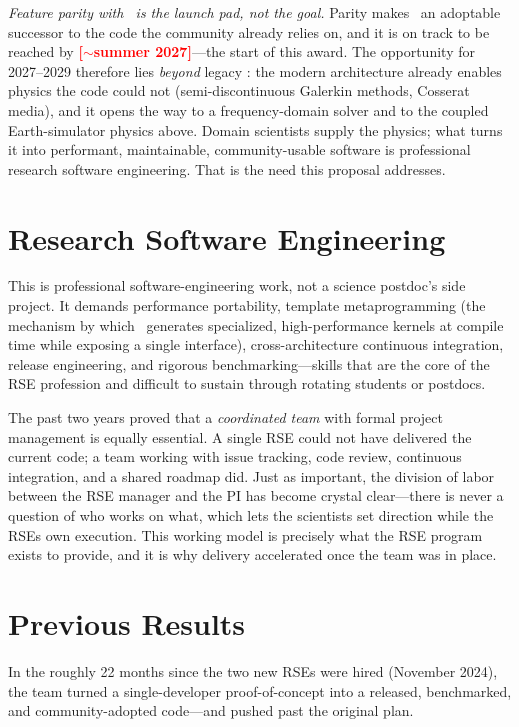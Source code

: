 \documentclass[11pt,letter]{article}
\newcommand{\note}[1]{\textbf{\textcolor{Red}{[#1]}}}
\begin{document}
\emph{Feature parity with \SFG\ is the launch pad, not the goal.} Parity makes \SFPP\ an adoptable successor to the code the community already relies on, and it is on track to be reached by \note{$\sim$summer 2027}---the start of this award. The opportunity for 2027--2029 therefore lies \emph{beyond} legacy \SF: the modern architecture already enables physics the  code could not (semi-discontinuous Galerkin methods, Cosserat media), and it opens the way to a frequency-domain solver and to the coupled Earth-simulator physics above. Domain scientists supply the physics; what turns it into performant, maintainable, community-usable software is professional research software engineering. That is the need this proposal addresses.

\section{Research Software Engineering}

This is professional software-engineering work, not a science postdoc's side project. It demands  performance portability,  template metaprogramming (the mechanism by which \SFPP\ generates specialized, high-performance kernels at compile time while exposing a single interface), cross-architecture continuous integration, release engineering, and rigorous benchmarking---skills that are the core of the RSE profession and difficult to sustain through rotating students or postdocs.

The past two years proved that a \emph{coordinated team} with formal project management is equally essential. A single RSE could not have delivered the current code; a team working with issue tracking, code review, continuous integration, and a shared roadmap did. Just as important, the division of labor between the RSE manager and the PI has become crystal clear---there is never a question of who works on what, which lets the scientists set direction while the RSEs own execution. This working model is precisely what the RSE program exists to provide, and it is why delivery accelerated once the team was in place.

\section{Previous Results}
In the roughly 22 months since the two new RSEs were hired (November 2024), the team turned a single-developer proof-of-concept into a released, benchmarked, and community-adopted code---and pushed past the original plan.
\end{document}
